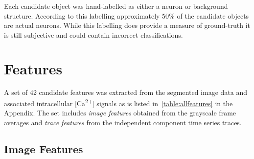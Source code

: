 \documentclass[10pt]{article}
\newcommand{\calcium}[0]{Ca\textsuperscript{2+}}
\begin{document}
Each candidate object was hand-labelled as either a neuron or background structure. 
According to this labelling approximately \num{50}\% of the candidate objects are actual neurons.
While this labelling does provide a measure of ground-truth it is still subjective and could contain incorrect classifications.

\section{Features}

A set of \num{42} candidate features was extracted from the segmented image data and associated intracellular [\calcium] signals as is listed in~\cref{table:allfeatures} in the Appendix.
The set includes \emph{image features} obtained from the grayscale frame averages and \emph{trace features} from the independent component time series traces.

\subsection{Image Features}
\end{document}
